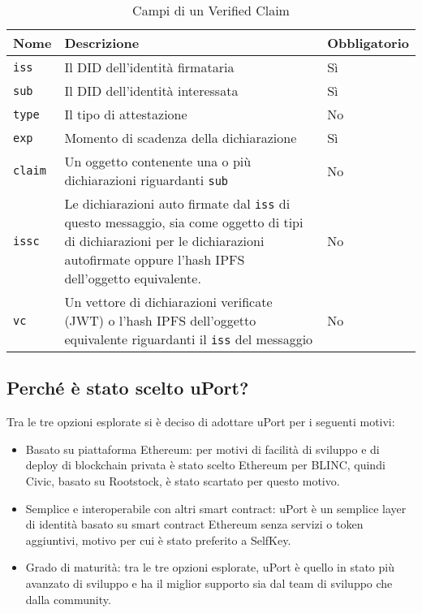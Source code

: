 \newpage

\begin{table}[htbp]
    \centering
      \begin{tabular}{p{6.165em}p{19.89em}p{6.335em}}
      \toprule
      \textbf{Nome} & \textbf{Descrizione} & \textbf{Obbligatorio} \\
      \midrule
      \texttt{iss} & Il DID dell’identità firmataria & Sì \\
      \midrule
      \texttt{sub} & Il DID dell’identità interessata & Sì \\
      \midrule
      \texttt{type} & Il tipo di attestazione & No \\
      \midrule
      \texttt{exp} & Momento di scadenza della dichiarazione & Sì \\
      \midrule
      \texttt{claim} & Un oggetto contenente una o più dichiarazioni riguardanti \texttt{sub} & No \\
      \midrule
      \texttt{issc} & Le dichiarazioni auto firmate dal \texttt{iss} di questo messaggio, sia come oggetto di tipi di dichiarazioni
      per le dichiarazioni autofirmate oppure l'hash IPFS dell'oggetto equivalente. & No \\
      \midrule
      \texttt{vc} & Un vettore di dichiarazioni verificate (JWT) o l'hash IPFS dell'oggetto equivalente riguardanti
      il \texttt{iss} del messaggio  & No \\
      \bottomrule
      \end{tabular}%
    \label{tab:verifiedclaim}%
    \caption{Campi di un Verified Claim}
  \end{table}%

\subsection{Perché è stato scelto uPort?}

Tra le tre opzioni esplorate si è deciso di adottare uPort per i seguenti motivi:

\begin{itemize}
    \item Basato su piattaforma Ethereum: per motivi di facilità di sviluppo e di deploy di blockchain privata è stato scelto
    Ethereum per BLINC, quindi Civic, basato su Rootstock, è stato scartato per questo motivo.
    \item Semplice e interoperabile con altri smart contract: uPort è un semplice layer di identità basato su 
    smart contract Ethereum senza servizi o token aggiuntivi, motivo per cui è stato preferito a SelfKey.
    \item Grado di maturità: tra le tre opzioni esplorate, uPort è quello in stato più avanzato di sviluppo e ha il miglior supporto
    sia dal team di sviluppo che dalla community.
\end{itemize}

